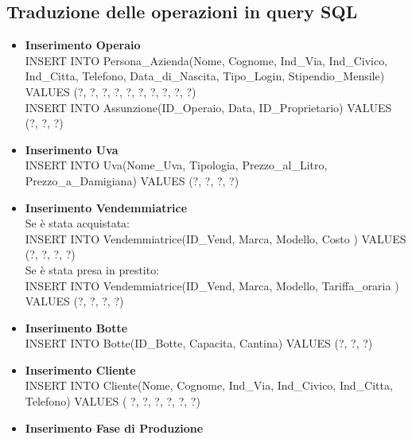 \documentclass{article}
\begin{document}
\subsection{Traduzione delle operazioni in query SQL}
\begin{itemize}
\item \textbf{Inserimento Operaio}\\\newline
INSERT INTO Persona\_Azienda(Nome, Cognome, Ind\_Via, Ind\_Civico, Ind\_Citta, Telefono, Data\_di\_Nascita, Tipo\_Login, Stipendio\_Mensile)  VALUES (?, ?, ?, ?, ?, ?, ?, ?, ?, ?)\\\newline
INSERT INTO Assunzione(ID\_Operaio, Data, ID\_Proprietario)  VALUES (?, ?, ?)\\\newline
\item \textbf{Inserimento Uva}\\\newline
INSERT INTO Uva(Nome\_Uva, Tipologia, Prezzo\_al\_Litro, Prezzo\_a\_Damigiana) VALUES (?, ?, ?, ?)\\\newline
\item \textbf{Inserimento Vendemmiatrice}\\\newline
Se è stata acquistata:  \\
INSERT INTO Vendemmiatrice(ID\_Vend, Marca, Modello, Costo ) VALUES (?, ?, ?, ?)\\\newline
Se è stata presa in prestito:\\
INSERT INTO Vendemmiatrice(ID\_Vend, Marca, Modello, Tariffa\_oraria ) VALUES (?, ?, ?, ?)\\\newline
\item \textbf{Inserimento Botte}\\\newline
INSERT INTO Botte(ID\_Botte, Capacita, Cantina) VALUES (?, ?, ?)\\\newline
\item \textbf{Inserimento Cliente}\\\newline
INSERT INTO Cliente(Nome, Cognome, Ind\_Via, Ind\_Civico, Ind\_Citta, Telefono) VALUES ( ?, ?, ?, ?, ?, ?)\\\newline
\item \textbf{Inserimento Fase di Produzione}\\\newline

\end{itemize}
\end{document}
